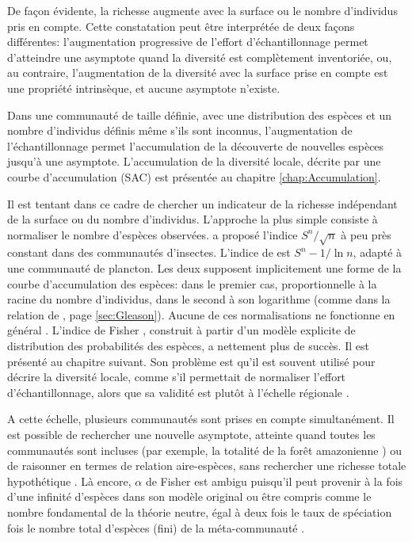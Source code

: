 \documentclass[
  11pt,
  french,
  a4paper,
  extrafontsizes,onecolumn,openright
  ]{memoir}
\newlength{\rf}
\begin{document}
\scriptsize

\normalsize

De façon évidente, la richesse augmente avec la surface ou le nombre d'individus pris en compte.
Cette constatation peut être interprétée de deux façons différentes: l'augmentation progressive de l'effort d'échantillonnage permet d'atteindre une asymptote quand la diversité est complètement inventoriée, ou, au contraire, l'augmentation de la diversité avec la surface prise en compte est une propriété intrinsèque, et aucune asymptote n'existe.

Dans une communauté de taille définie, avec une distribution des espèces et un nombre d'individus définis même s'ils sont inconnus, l'augmentation de l'échantillonnage permet l'accumulation de la découverte de nouvelles espèces jusqu'à une asymptote.
L'accumulation de la diversité locale, décrite par une courbe d'accumulation (SAC) est présentée au chapitre \ref{chap:Accumulation}.

Il est tentant dans ce cadre de chercher un indicateur de la richesse indépendant de la surface ou du nombre d'individus.
L'approche la plus simple consiste à normaliser le nombre d'espèces observées.
\textcite{Menhinick1964} a proposé l'indice \({S^{n}}/{\sqrt{n}}\) à peu près constant dans des communautés d'insectes.
L'indice de \textcite{Margalef1958a} est \({S^{n} -1}/{\ln{n}}\), adapté à une communauté de plancton.
Les deux supposent implicitement une forme de la courbe d'accumulation des espèces: dans le premier cas, proportionnelle à la racine du nombre d'individus, dans le second à son logarithme (comme dans la relation de \textcite{Gleason1922}, page \ref{sec:Gleason}).
Aucune de ces normalisations ne fonctionne en général \autocite[p.~77]{Magurran2004}.
L'indice de Fisher \autocite{Fisher1943}, construit à partir d'un modèle explicite de distribution des probabilités des espèces, a nettement plus de succès.
Il est présenté au chapitre suivant.
Son problème est qu'il est souvent utilisé pour décrire la diversité locale, comme s'il permettait de normaliser l'effort d'échantillonnage, alors que sa validité est plutôt à l'échelle régionale \autocite{Hubbell2001}.

A cette échelle, plusieurs communautés sont prises en compte simultanément.
Il est possible de rechercher une nouvelle asymptote, atteinte quand toutes les communautés sont incluses (par exemple, la totalité de la forêt amazonienne \autocite{TerSteege2013}) ou de raisonner en termes de relation aire-espèces, sans rechercher une richesse totale hypothétique \autocite{Preston1960}.
Là encore, \(\alpha\) de Fisher est ambigu puisqu'il peut provenir à la fois d'une infinité d'espèces dans son modèle original ou être compris comme le nombre fondamental de la théorie neutre, égal à deux fois le taux de spéciation fois le nombre total d'espèces (fini) de la méta-communauté \autocite{Hubbell2001}.
\end{document}
